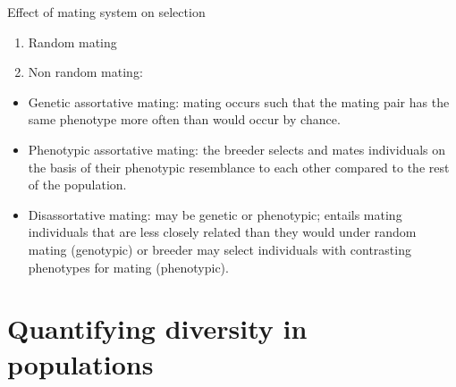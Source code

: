 \documentclass[11pt,dvipsnames,ignorenonframetext,aspectratio=169]{beamer}
\providecommand{\tightlist}{%
  \setlength{\itemsep}{0pt}\setlength{\parskip}{0pt}}
\begin{document}
\begin{frame}{Effect of mating system on selection}
\protect\hypertarget{effect-of-mating-system-on-selection}{}
\begin{enumerate}
\tightlist
\item
  Random mating
\item
  Non random mating:
\end{enumerate}

\begin{itemize}
\tightlist
\item
  Genetic assortative mating: mating occurs such that the mating pair
  has the same phenotype more often than would occur by chance.
\item
  Phenotypic assortative mating: the breeder selects and mates
  individuals on the basis of their phenotypic resemblance to each other
  compared to the rest of the population.
\item
  Disassortative mating: may be genetic or phenotypic; entails mating
  individuals that are less closely related than they would under random
  mating (genotypic) or breeder may select individuals with contrasting
  phenotypes for mating (phenotypic).
\end{itemize}
\end{frame}

\hypertarget{quantifying-diversity-in-populations}{%
\section{Quantifying diversity in
populations}\label{quantifying-diversity-in-populations}}
\end{document}
